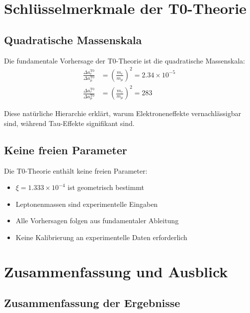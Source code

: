 \documentclass[12pt,a4paper]{article}
\begin{document}
	\section{Schlüsselmerkmale der T0-Theorie}
	
	\subsection{Quadratische Massenskala}
	
	\begin{keyresult}
		Die fundamentale Vorhersage der T0-Theorie ist die quadratische Massenskala:
		\begin{align}
			\frac{\Delta a_e^{\mathrm{T0}}}{\Delta a_\mu^{\mathrm{T0}}} &= \left(\frac{m_e}{m_\mu}\right)^2 = 2.34 \times 10^{-5} \\
			\frac{\Delta a_\tau^{\mathrm{T0}}}{\Delta a_\mu^{\mathrm{T0}}} &= \left(\frac{m_\tau}{m_\mu}\right)^2 = 283
		\end{align}
		
		Diese natürliche Hierarchie erklärt, warum Elektroneneffekte vernachlässigbar sind, während Tau-Effekte signifikant sind.
	\end{keyresult}
	
	\subsection{Keine freien Parameter}
	
	\begin{keyresult}
		Die T0-Theorie enthält keine freien Parameter:
		\begin{itemize}
			\item $\xi = 1.333 \times 10^{-4}$ ist geometrisch bestimmt
			\item Leptonenmassen sind experimentelle Eingaben
			\item Alle Vorhersagen folgen aus fundamentaler Ableitung
			\item Keine Kalibrierung an experimentelle Daten erforderlich
		\end{itemize}
	\end{keyresult}
	
	\section{Zusammenfassung und Ausblick}
	
	\subsection{Zusammenfassung der Ergebnisse}
	
\end{document}
